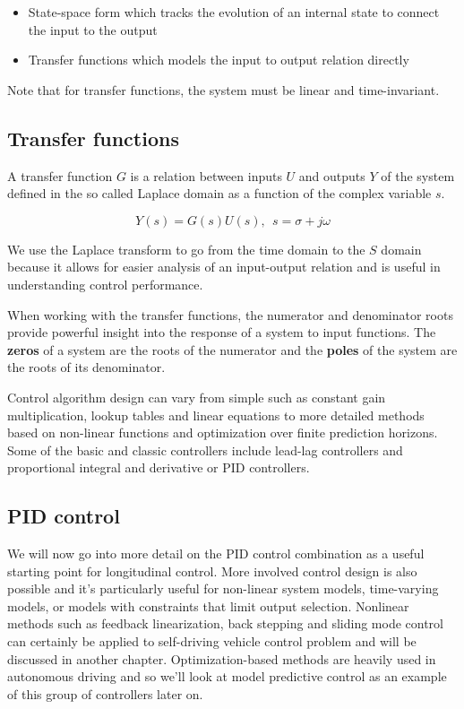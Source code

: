 \begin{itemize}
\item State-space form which tracks the evolution of an internal state 
to connect the input to the output 
\item Transfer functions which models the input to output relation directly
\end{itemize} 

\begin{framed}
\theoremstyle{remark}
\begin{remark}{}

Note that for transfer functions, the system must be linear and time-invariant.
\end{remark}
\end{framed}

\subsection{Transfer functions}
\label{transfer_functions}

A transfer function $G$ is a relation between inputs $U$ and outputs $Y$ of the system defined in the so called Laplace domain as a function of  the complex variable $s$. 

\begin{equation}
Y(s) = G(s) U(s), ~~ s= \sigma + j \omega
\end{equation}

We use the Laplace transform to go from the time domain to the $S$ domain because it allows for easier analysis of an input-output relation 
and is useful in understanding control performance. 

When working with the transfer functions, the numerator and denominator roots provide powerful insight into the response of a system to input functions. 
The {\textbf{zeros}} of a system are the roots of the numerator and the {\textbf{poles}} of the system are the roots of its denominator. 

Control algorithm design can vary from simple such as constant gain multiplication, lookup tables and linear equations to more detailed methods based on non-linear functions and optimization over finite prediction horizons. Some of the basic and classic controllers include lead-lag controllers and proportional integral and derivative or PID controllers. 


\subsection{PID control}
\label{pid_control} 
We will now go into more detail on the PID control combination as a useful starting point for longitudinal control. More involved control design is also possible and it's particularly useful for non-linear system models, time-varying models, or models with constraints that limit output selection. Nonlinear methods such as feedback linearization, back stepping and sliding mode control  can certainly be applied to self-driving vehicle control problem and will be discussed in another chapter. Optimization-based methods are heavily used in autonomous driving and so we'll look at model predictive control as an example of this group of controllers later on. 

